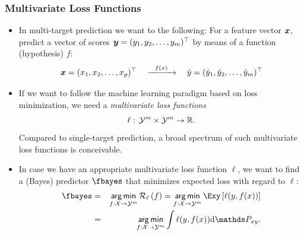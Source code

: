 \begin{frame}
	\frametitle{Multivariate Loss Functions}
	\begin{itemize}
%		
		\small
%		
		\item In multi-target prediction we want to the following: For a feature vector $\bm{x}$, predict a vector of scores $\bm{y} = (y_1, y_2, \ldots, y_m)^\top$ by means of a function (hypothesis) $f$:
		$$
		\bm{x} = (x_1,x_2,\ldots,x_p)^\top \quad \xrightarrow{~~f(x)~~} \quad \hat{y} = ( \hat{y}_1, \hat{y}_2, \ldots, \hat{y}_m)^\top
		$$
%		
		\item If we want to follow the machine learning paradigm based on loss minimization, we need a \emph{multivariate loss functions} 
		$$
		\ell: \, \mathcal{Y}^m \times \mathcal{Y}^m \rightarrow \mathbb{R}.
		$$  
		Compared to single-target prediction,  a broad spectrum of such multivariate loss functions	is conceivable. 
%		
		\item In case we have an appropriate multivariate loss function $\ell$, we want to find a (Bayes) predictor $\fbayes$ that minimizes expected loss with regard to $\ell:$
%		
		\begin{eqnarray*}
			\fbayes &=& \argmin_{f: \Xspace \to \Yspace^m} \risk_\ell \left(f\right) = \argmin_{f: \Xspace \to \Yspace^m}\Exy\left[ \ell(y,\fx) \right]\\ &=&  \argmin_{f: \Xspace \to \Yspace^m }\int \ell(y,\fx) \text{d}\Pxy. 
		\end{eqnarray*}
%				
%		
%
	\end{itemize}
	
\end{frame}




